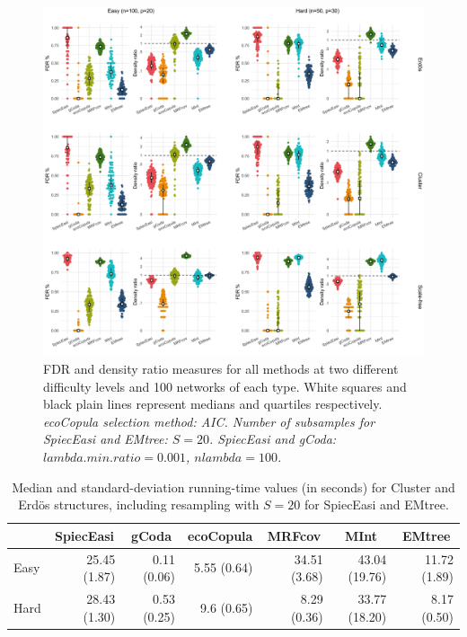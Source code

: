 \begin{figure}
    \centering
    \includegraphics[width=\linewidth]{figs/panel_TPFN_signed.png}
    \caption{FDR and density ratio measures for all methods at two different difficulty levels and 100 networks of each type. White squares and black plain lines represent medians and quartiles respectively. \small{\textit{ecoCopula selection method: AIC. Number of subsamples for SpiecEasi and EMtree: $S=20$. SpiecEasi and gCoda: $lambda.min.ratio=0.001$,  $nlambda=100$.}}}
    \label{TPFN}
\end{figure}

\begin{table}[ht]
\centering
 
\begin{tabular}{l|rrrrrr}
 & \multicolumn{1}{c}{SpiecEasi} & \multicolumn{1}{c}{gCoda} & \multicolumn{1}{c}{ecoCopula} & \multicolumn{1}{c}{MRFcov} & \multicolumn{1}{c}{MInt} & \multicolumn{1}{c}{EMtree} \\ 
  \hline
Easy & 25.45  (1.87) & 0.11  (0.06) & 5.55  (0.64) & 34.51  (3.68) & 43.04  (19.76) & 11.72  (1.89) \\ 
  Hard & 28.43  (1.30) & 0.53  (0.25) & 9.6  (0.65) & 8.29  (0.36) & 33.77  (18.20) & 8.17  (0.50) \\ 
   \hline
\end{tabular}
\caption{Median and standard-deviation running-time values (in seconds) for Cluster and Erdös structures, including resampling with $S=20$ for SpiecEasi and EMtree.}
\label{timesTPFN}
\end{table}




